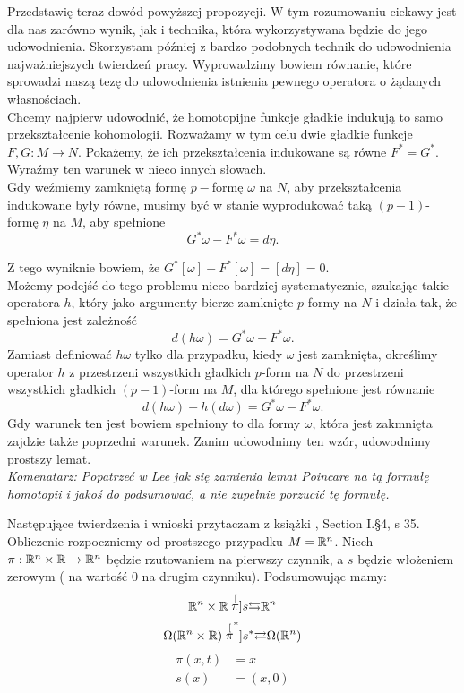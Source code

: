 \documentclass[licencjacka]{pracamgr}
\theoremstyle{definition}
\theoremstyle{definition}
\theoremstyle{plain}
\theoremstyle{plain}
\theoremstyle{plain}
\theoremstyle{plain}
\def\R{\ensuremath\mathbb{R}}
\begin{document}
Przedstawię teraz dowód powyższej propozycji.  W tym rozumowaniu ciekawy jest
dla nas zarówno wynik, jak i technika, która wykorzystywana będzie do jego
udowodnienia.  Skorzystam później z bardzo podobnych technik do udowodnienia
najważniejszych twierdzeń pracy.  Wyprowadzimy bowiem równanie, które sprowadzi
naszą tezę do udowodnienia istnienia pewnego operatora o żądanych własnościach.  \\

Chcemy najpierw udowodnić, że homotopijne funkcje gładkie indukują to samo
przekształcenie kohomologii.  Rozważamy w tym celu dwie gładkie funkcje $F, G:
M \rightarrow N$.  Pokażemy, że ich przekształcenia indukowane są równe
$F^\ast = G^\ast$. Wyraźmy ten warunek w nieco innych słowach. \\

Gdy weźmiemy zamkniętą formę $p-$formę $\omega$ na $N$, aby
przekształcenia indukowane były równe, musimy być w stanie
wyprodukować taką $(p-1)$-formę $\eta$ na $M$, aby spełnione
\[
    G^\ast \omega - F^\ast \omega = d\eta.
\]

Z tego wyniknie bowiem, że
$ G^\ast [\omega] - F^\ast [\omega] =
[d\eta] = 0$. \\

Możemy podejść do tego problemu nieco bardziej systematycznie, 
szukając takie operatora
$h$, który jako argumenty bierze zamknięte $p$ formy na $N$
i działa tak, że spełniona jest zależność
\[
    d(h\omega) = G^\ast \omega - F^\ast \omega.
\] 
Zamiast definiować $h \omega$ tylko dla przypadku, kiedy $\omega$
jest zamknięta, określimy operator
$h$ z przestrzeni wszystkich gładkich $p$-form na $N$
do przestrzeni wszystkich gładkich $(p-1)$-form na $M$,
dla którego spełnione jest równanie
\[
    d(h\omega) + h(d\omega) = G^\ast \omega - F^\ast \omega.
\]
Gdy warunek ten jest bowiem spełniony to dla formy $\omega$, która
jest zakmnięta zajdzie także poprzedni warunek.  Zanim udowodnimy
ten wzór, udowodnimy prostszy lemat. \\

\emph{Komenatarz: Popatrzeć w Lee jak się zamienia lemat Poincare na tą formułę
homotopii i jakoś do podsumować, a nie zupełnie porzucić tę formułę.}

Następujące twierdzenia i wnioski przytaczam z książki \cite{bott}, Section
I.\S4, s 35. \\

Obliczenie rozpoczniemy od prostszego przypadku $M = \R^n$.
Niech $\pi: \R^n \times \R \rightarrow \R^n$  będzie rzutowaniem
na pierwszy czynnik, a $s$  będzie włożeniem zerowym (
na wartość $0$ na drugim czynniku). Podsumowując mamy:
\[
 \R^n \times \R
 \stackrel[\pi]{s}{\leftrightarrows} 
 \R^n
\]
\[
 \Omega (\R^n \times \R)
 \stackrel[\pi^\ast]{s^\ast}{\rightleftarrows} 
 \Omega(\R^n)
\]
\begin{align*}
    \pi(x, t) &= x \\
         s(x) &= (x, 0)
\end{align*}
\end{document}
